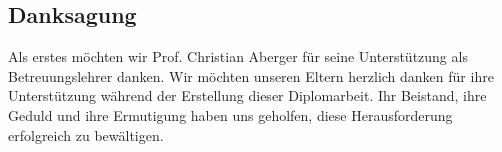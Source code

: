 \begin{spacing}{1}
    \chapter*{Danksagung}
\end{spacing}
Als erstes möchten wir Prof. Christian Aberger
für seine Unterstützung als Betreuungslehrer danken.
\newline
Wir möchten unseren Eltern herzlich danken für ihre Unterstützung während 
der Erstellung dieser Diplomarbeit. Ihr Beistand, ihre Geduld und ihre 
Ermutigung haben uns geholfen, diese Herausforderung erfolgreich zu bewältigen.

